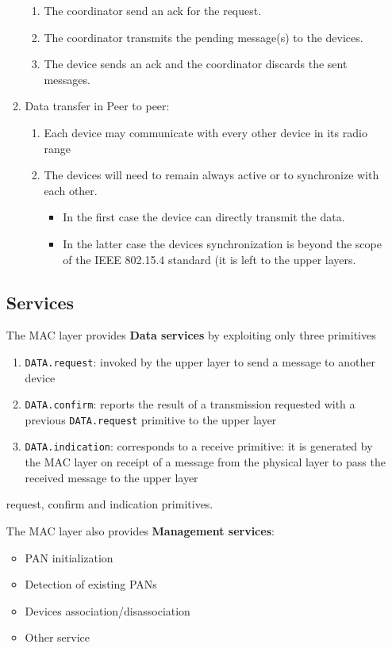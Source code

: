 \begin{itemize}
\begin{enumerate}
\begin{enumerate}
      \item The coordinator send an ack for the request.
      \item The coordinator transmits the pending message(s) to the devices.
      \item The device sends an ack and the coordinator discards the sent messages. 
   \end{enumerate}
   \item Data transfer in Peer to peer:
   \begin{enumerate}
      \item Each device may communicate with every other device in its radio range
      \item The devices will need to remain always active or to synchronize with each other.
      \begin{itemize}
         \item In the first case the device can directly transmit the data.
         \item In the latter case the devices synchronization is beyond the scope of
         the IEEE 802.15.4 standard (it is left to the upper layers.
      \end{itemize}
   \end{enumerate}
\end{enumerate}

\subsection{Services}

The MAC layer provides \textbf{Data services} by exploiting only three primitives
\begin{enumerate} 
   \item \texttt{DATA.request}: invoked by the upper layer to send a message to another device  
   \item \texttt{DATA.confirm}: reports the result of a transmission requested with a previous \texttt{DATA.request} primitive to the upper layer 
   \item \texttt{DATA.indication}: corresponds to a receive primitive: it is generated by the MAC layer on receipt of a message from the physical layer to pass the received message to the upper layer
\end{enumerate} request, confirm and indication primitives.
\nl

The MAC layer also provides \textbf{Management services}:
\begin{itemize}
   \item PAN initialization
   \item Detection of existing PANs
   \item Devices association/disassociation
   \item Other service
\end{itemize}


\end{itemize}
